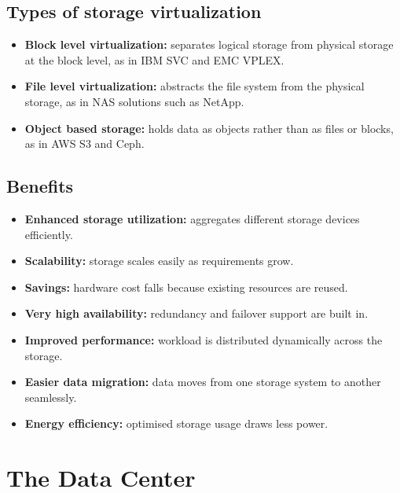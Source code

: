 \documentclass[11pt,a4paper]{article}
\begin{document}
\subsection{Types of storage virtualization}

\begin{itemize}\itemsep3pt
  \item \textbf{Block level virtualization:} separates logical storage from physical storage
        at the block level, as in IBM SVC and EMC VPLEX.
  \item \textbf{File level virtualization:} abstracts the file system from the physical
        storage, as in NAS solutions such as NetApp.
  \item \textbf{Object based storage:} holds data as objects rather than as files or blocks,
        as in AWS S3 and Ceph.
\end{itemize}

\subsection{Benefits}

\begin{itemize}\itemsep3pt
  \item \textbf{Enhanced storage utilization:} aggregates different storage devices
        efficiently.
  \item \textbf{Scalability:} storage scales easily as requirements grow.
  \item \textbf{Savings:} hardware cost falls because existing resources are reused.
  \item \textbf{Very high availability:} redundancy and failover support are built in.
  \item \textbf{Improved performance:} workload is distributed dynamically across the storage.
  \item \textbf{Easier data migration:} data moves from one storage system to another
        seamlessly.
  \item \textbf{Energy efficiency:} optimised storage usage draws less power.
\end{itemize}

\newpage
\section{The Data Center}

\end{document}
